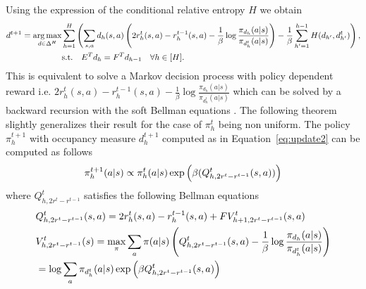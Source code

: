 \begin{remark}
Using the expression of the conditional relative entropy $H$ we obtain
\begin{align*}
d^{t+1} = \operatorname*{arg\,max}_{d\in\Delta^H} &\sum^H_{h=1}\left({\sum_{s,a}d_h(s,a)\left({2 r^t_h(s,a) - r^{t-1}_h(s,a) - \frac{1}{\beta}\log \frac{\pi_{d_h}(a|s)}{\pi_{d^t_h}(a|s)}}\right) - \frac{1}{\beta} \sum^{h-1}_{h'=1} H(d_{h'}, d^t_{h'})}\right),\nonumber \\
&\text{s.t.} \quad E^T d_h = F^T d_{h-1} \quad \forall h \in [H].
\end{align*}
This is equivalent to solve a Markov decision process with policy dependent reward i.e. $2r^t_h(s,a) - r^{t-1}_h(s,a) - \frac{1}{\beta}\log \frac{\pi_{d_h}(a|s)}{\pi_{d^t_h}(a|s)}$ which can be solved by a backward recursion with the soft Bellman equations \cite[Corollary 6.8]{ziebart2010modeling}. The following theorem slightly generalizes their result for the case of $\pi^t_h$ being non uniform.
The policy $\pi^{t+1}_h$ with occupancy measure $d^{t+1}_h$ computed as in Equation~\ref{eq:update2} can be computed as follows 
    \begin{align*}
        \pi^{t+1}_h(a|s) \propto \pi^t_h(a|s) \exp\left({\beta(Q^t_{h, 2r^t - r^{t-1}}(s,a))}\right)
    \end{align*}
    where $Q^t_{h, 2r^t - r^{t-1}}$ satisfies the following Bellman equations
    \begin{align*}
        &Q^t_{h, 2r^t - r^{t-1}}(s,a) = 2r_h^t(s,a) - r_h^{t-1}(s,a) + F V^t_{h+1, 2r^t - r^{t-1}}(s,a) \\
        &V^t_{h, 2r^t - r^{t-1}}(s) = \max_{\pi} \sum_a \pi(a|s) \left({Q^t_{h, 2r^t - r^{t-1}}(s,a) - \frac{1}{\beta} \log \frac{\pi_{d_h}(a|s)}{\pi_{d^t_h}(a|s)}}\right) \\&=
        \log \sum_{a} \pi_{d^t_h}(a|s) \exp\left({\beta Q^t_{h, 2r^t - r^{t-1}}(s,a)}\right)
    \end{align*}
\fi
\end{remark}
\fi
